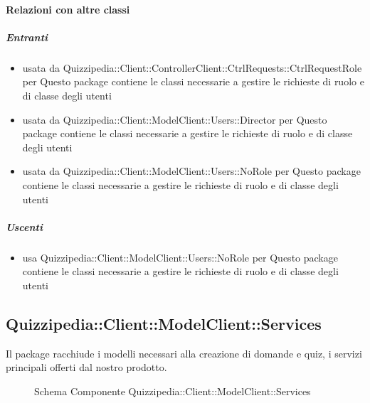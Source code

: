 \paragraph{Relazioni con altre classi}
\subparagraph{Entranti}
\begin{itemize}
\item usata da Quizzipedia::Client::ControllerClient::CtrlRequests::CtrlRequestRole per Questo package contiene le classi necessarie a gestire le richieste di ruolo e di classe degli utenti
\item usata da Quizzipedia::Client::ModelClient::Users::Director per Questo package contiene le classi necessarie a gestire le richieste di ruolo e di classe degli utenti
\item usata da Quizzipedia::Client::ModelClient::Users::NoRole per Questo package contiene le classi necessarie a gestire le richieste di ruolo e di classe degli utenti
\end{itemize}
\subparagraph{Uscenti}
\begin{itemize}
\item usa Quizzipedia::Client::ModelClient::Users::NoRole per Questo package contiene le classi necessarie a gestire le richieste di ruolo e di classe degli utenti
\end{itemize}
\subsection{Quizzipedia::Client::ModelClient::Services}
Il package racchiude i modelli necessari alla creazione di domande e quiz, i servizi principali offerti dal nostro prodotto.
\begin{figure}[H]
\centering
\noindent{}
\caption[Schema Componente Quizzipedia::Client::ModelClient::Services]{Schema Componente Quizzipedia::Client::ModelClient::Services}
\end{figure}
